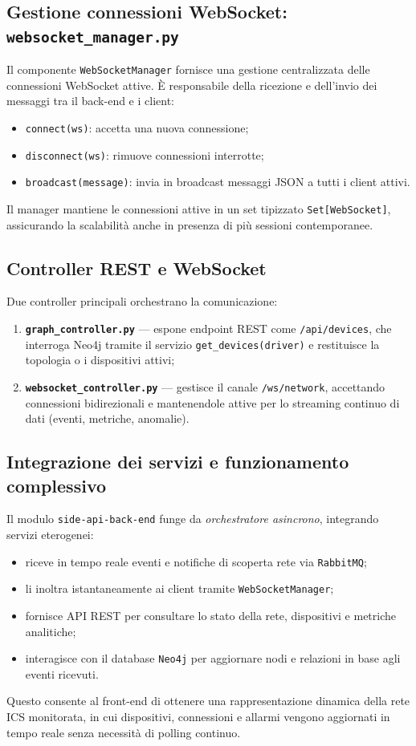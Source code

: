 \subsection{Gestione connessioni WebSocket: \texttt{websocket\_manager.py}}
Il componente \texttt{WebSocketManager} fornisce una gestione centralizzata delle connessioni WebSocket attive.  
È responsabile della ricezione e dell’invio dei messaggi tra il back-end e i client:
\begin{itemize}
  \item \texttt{connect(ws)}: accetta una nuova connessione;
  \item \texttt{disconnect(ws)}: rimuove connessioni interrotte;
  \item \texttt{broadcast(message)}: invia in broadcast messaggi JSON a tutti i client attivi.
\end{itemize}
Il manager mantiene le connessioni attive in un set tipizzato \texttt{Set[WebSocket]}, assicurando la scalabilità anche in presenza di più sessioni contemporanee.

\subsection{Controller REST e WebSocket}
Due controller principali orchestrano la comunicazione:
\begin{enumerate}
  \item \textbf{\texttt{graph\_controller.py}} — espone endpoint REST come \texttt{/api/devices}, che interroga Neo4j tramite il servizio \texttt{get\_devices(driver)} e restituisce la topologia o i dispositivi attivi;
  \item \textbf{\texttt{websocket\_controller.py}} — gestisce il canale \texttt{/ws/network}, accettando connessioni bidirezionali e mantenendole attive per lo streaming continuo di dati (eventi, metriche, anomalie).
\end{enumerate}

\subsection{Integrazione dei servizi e funzionamento complessivo}
Il modulo \texttt{side-api-back-end} funge da \textit{orchestratore asincrono}, integrando servizi eterogenei:
\begin{itemize}
  \item riceve in tempo reale eventi e notifiche di scoperta rete via \texttt{RabbitMQ};
  \item li inoltra istantaneamente ai client tramite \texttt{WebSocketManager};
  \item fornisce API REST per consultare lo stato della rete, dispositivi e metriche analitiche;
  \item interagisce con il database \texttt{Neo4j} per aggiornare nodi e relazioni in base agli eventi ricevuti.
\end{itemize}
Questo consente al front-end di ottenere una rappresentazione dinamica della rete ICS monitorata, in cui dispositivi, connessioni e allarmi vengono aggiornati in tempo reale senza necessità di polling continuo.


